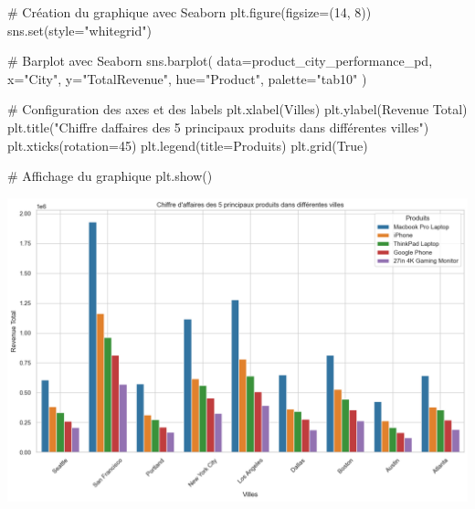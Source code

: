 \documentclass[
  letterpaper,
  DIV=11,
  numbers=noendperiod]{scrartcl}
\newenvironment{Shaded}{\begin{snugshade}}{\end{snugshade}}
\newcommand{\BuiltInTok}[1]{\textcolor[rgb]{0.00,0.23,0.31}{#1}}
\newcommand{\CommentTok}[1]{\textcolor[rgb]{0.37,0.37,0.37}{#1}}
\newcommand{\DecValTok}[1]{\textcolor[rgb]{0.68,0.00,0.00}{#1}}
\newcommand{\NormalTok}[1]{\textcolor[rgb]{0.00,0.23,0.31}{#1}}
\newcommand{\OperatorTok}[1]{\textcolor[rgb]{0.37,0.37,0.37}{#1}}
\newcommand{\StringTok}[1]{\textcolor[rgb]{0.13,0.47,0.30}{#1}}
\newcommand{\VariableTok}[1]{\textcolor[rgb]{0.07,0.07,0.07}{#1}}
\begin{document}
\begin{Shaded}
\begin{Highlighting}[]
\CommentTok{\# Création du graphique avec Seaborn}
\NormalTok{plt.figure(figsize}\OperatorTok{=}\NormalTok{(}\DecValTok{14}\NormalTok{, }\DecValTok{8}\NormalTok{))}
\NormalTok{sns.}\BuiltInTok{set}\NormalTok{(style}\OperatorTok{=}\StringTok{"whitegrid"}\NormalTok{)}

\CommentTok{\# Barplot avec Seaborn}
\NormalTok{sns.barplot(}
\NormalTok{    data}\OperatorTok{=}\NormalTok{product\_city\_performance\_pd,}
\NormalTok{    x}\OperatorTok{=}\StringTok{"City"}\NormalTok{,}
\NormalTok{    y}\OperatorTok{=}\StringTok{"TotalRevenue"}\NormalTok{,}
\NormalTok{    hue}\OperatorTok{=}\StringTok{"Product"}\NormalTok{,}
\NormalTok{    palette}\OperatorTok{=}\StringTok{"tab10"}
\NormalTok{)}

\CommentTok{\# Configuration des axes et des labels}
\NormalTok{plt.xlabel(}\StringTok{\textquotesingle{}Villes\textquotesingle{}}\NormalTok{)}
\NormalTok{plt.ylabel(}\StringTok{\textquotesingle{}Revenue Total\textquotesingle{}}\NormalTok{)}
\NormalTok{plt.title(}\StringTok{"Chiffre d\textquotesingle{}affaires des 5 principaux produits dans différentes villes"}\NormalTok{)}
\NormalTok{plt.xticks(rotation}\OperatorTok{=}\DecValTok{45}\NormalTok{)}
\NormalTok{plt.legend(title}\OperatorTok{=}\StringTok{\textquotesingle{}Produits\textquotesingle{}}\NormalTok{)}
\NormalTok{plt.grid(}\VariableTok{True}\NormalTok{)}

\CommentTok{\# Affichage du graphique}
\NormalTok{plt.show()}
\end{Highlighting}
\end{Shaded}

\includegraphics{Projet_Spark_GIRONDIN_Audric_files/figure-pdf/cell-23-output-1.png}
\end{document}
